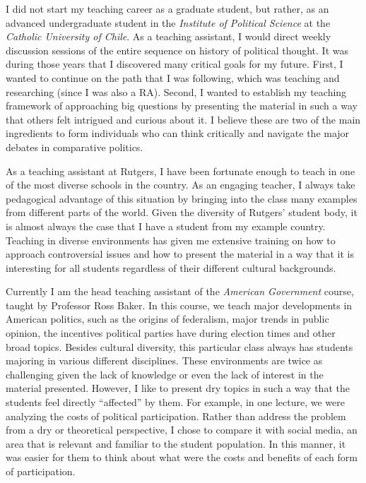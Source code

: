 \documentclass[11pt]{letter} %
\begin{document}
\begin{letter}{}
I did not start my teaching career as a graduate student, but rather, as an advanced undergraduate student in the \emph{Institute of Political Science} at the \emph{Catholic University of Chile}. As a teaching assistant, I would direct weekly discussion sessions of the entire sequence on history of political thought. It was during those years that I discovered many critical goals for my future. First, I wanted to continue on the path that I was following, which was teaching and researching (since I was also a RA). Second, I wanted to establish my teaching framework of approaching big questions by presenting the material in such a way that others felt intrigued and curious about it. I believe these are two of the main ingredients to form individuals who can think critically and navigate the major debates in comparative politics. 

As a teaching assistant at Rutgers, I have been fortunate enough to teach in one of the most diverse schools in the country. As an engaging teacher, I always take pedagogical advantage of this situation by bringing into the class many examples from different parts of the world. Given the diversity of Rutgers' student body, it is almost always the case that I have a student from my example country. Teaching in diverse environments has given me extensive training on how to approach controversial issues and how to present the material in a way that it is interesting for all students regardless of their different cultural backgrounds. 

Currently I am the head teaching assistant of the \emph{American Government} course, taught by Professor Ross Baker. In this course, we teach major developments in American politics, such as the origins of federalism, major trends in public opinion, the incentives political parties have during election times and other broad topics. Besides cultural diversity, this particular class always has students majoring in various different disciplines. These environments are twice as challenging given the lack of knowledge or even the lack of interest in the material presented. However, I like to present dry topics in such a way that the students feel directly ``affected'' by them. For example, in one lecture, we were analyzing the costs of political participation. Rather than address the problem from a dry or theoretical perspective, I chose to compare it with social media, an area that is relevant and familiar to the student population. In this manner, it was easier for them to think about what were the costs and benefits of each form of participation. 


\end{letter}
\end{document}
